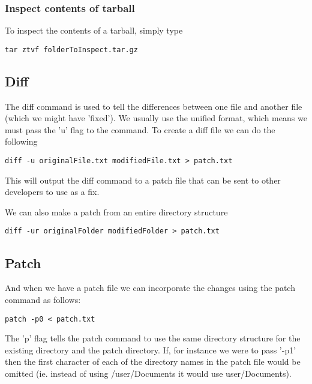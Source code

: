 \documentclass[a4paper, 10pt]{article}
\begin{document}
\subsubsection*{Inspect contents of tarball}
\label{sec:insp-cont-tarb}

To inspect the contents of a tarball, simply type
\begin{verbatim}
tar ztvf folderToInspect.tar.gz
\end{verbatim}

\subsection*{Diff}
\label{sec:diff}

The diff command is used to tell the differences between one file and
another file (which we might have 'fixed'). We usually use the unified
format, which means we must pass the 'u' flag to the command. To
create a diff file we can do the following
\begin{verbatim}
diff -u originalFile.txt modifiedFile.txt > patch.txt
\end{verbatim}
This will output the diff command to a patch file that can be sent to
other developers to use as a fix.

We can also make a patch from an entire directory structure
\begin{verbatim}
diff -ur originalFolder modifiedFolder > patch.txt
\end{verbatim}

\subsection*{Patch}
\label{sec:patch}

And when we have a patch file we can incorporate the changes using the
patch command as follows:
\begin{verbatim}
patch -p0 < patch.txt
\end{verbatim}
The 'p' flag tells the patch command to use the same directory
structure for the existing directory and the patch directory. If, for
instance we were to pass '-p1' then the first character of each of the
directory names in the patch file would be omitted (ie. instead of
using /user/Documents it would use user/Documents).
\end{document}
